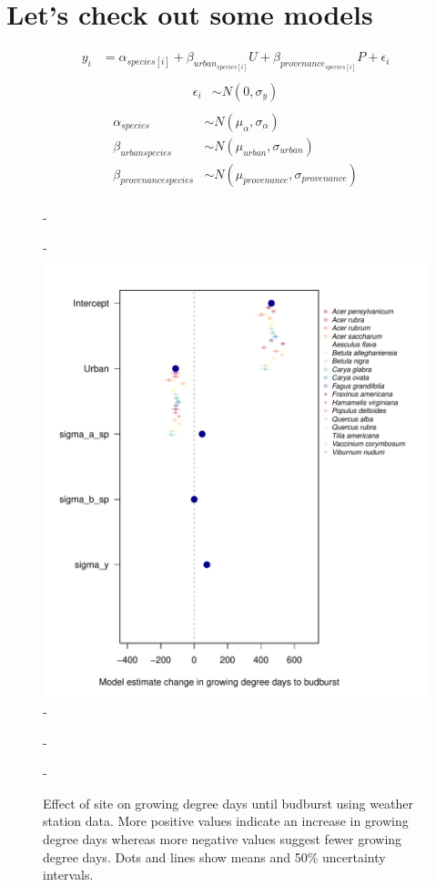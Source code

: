 \documentclass{article}\usepackage[]{graphicx}\usepackage[]{color}
\begin{document}
\renewcommand{\thetable}{\arabic{table}}
\renewcommand{\thefigure}{\arabic{figure}}
\renewcommand{\labelitemi}{$-$}


\section*{Let's check out some models}


\begin{align*}
y_i &= \alpha_{species[i]} + \beta_{urban_{species[i]}}U + \beta_{provenance_{species[i]}}P + \epsilon_i\\
\end{align*}
\begin{align*}
\epsilon_i & \sim N(0,\sigma_y) \\
\end{align*}
\begin{align*}
\alpha_{species} & \sim N(\mu_{\alpha}, \sigma_{\alpha}) \\
\beta_{urban{species}} & \sim N(\mu_{urban}, \sigma_{urban}) \\
\beta_{provenance{species}} & \sim N(\mu_{provenance}, \sigma_{provenance}) \\
\end{align*}

{\begin{figure} [H]
  -\begin{center}
  -\includegraphics[width=12cm]{..//analyses/figures/muplotws_urb.pdf}
  -\caption{Effect of site on growing degree days until budburst using weather station data. More positive values indicate an increase in growing degree days whereas more negative values suggest fewer growing degree days. Dots and lines show means and 50\% uncertainty intervals.}
  -\end{center}
  -\end{figure}}
\end{document}

